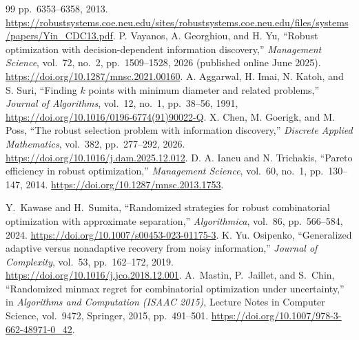 \documentclass[12pt]{article}
\begin{document}
\begin{thebibliography}{99}
pp.~6353--6358, 2013.
\url{https://robustsystems.coe.neu.edu/sites/robustsystems.coe.neu.edu/files/systems/papers/Yin_CDC13.pdf}.
 P. Vayanos, A. Georghiou, and H. Yu,
``Robust optimization with decision-dependent information discovery,''
\emph{Management Science}, vol.~72, no.~2, pp.~1509--1528, 2026
(published online June 2025).
\url{https://doi.org/10.1287/mnsc.2021.00160}.
 A. Aggarwal, H. Imai, N. Katoh, and S. Suri, ``Finding
$k$ points with minimum diameter and related problems,'' \emph{Journal of
Algorithms}, vol.~12, no.~1, pp.~38--56, 1991,
\url{https://doi.org/10.1016/0196-6774(91)90022-Q}.
 X. Chen, M. Goerigk, and M. Poss, ``The robust selection
problem with information discovery,'' \emph{Discrete Applied Mathematics},
vol.~382, pp.~277--292, 2026. \url{https://doi.org/10.1016/j.dam.2025.12.012}.
 D. A. Iancu and N. Trichakis, ``Pareto efficiency in robust
optimization,'' \emph{Management Science}, vol.~60, no.~1, pp.~130--147, 2014.
\url{https://doi.org/10.1287/mnsc.2013.1753}.

Y.~Kawase and H.~Sumita, ``Randomized strategies for robust combinatorial
optimization with approximate separation,'' \emph{Algorithmica}, vol.~86,
pp.~566--584, 2024. \url{https://doi.org/10.1007/s00453-023-01175-3}.
 K. Yu. Osipenko,
``Generalized adaptive versus nonadaptive recovery from noisy information,''
\emph{Journal of Complexity}, vol.~53, pp.~162--172, 2019.
\url{https://doi.org/10.1016/j.jco.2018.12.001}.
A.~Mastin, P.~Jaillet, and S.~Chin, ``Randomized minmax regret for
combinatorial optimization under uncertainty,'' in \emph{Algorithms and
Computation (ISAAC 2015)}, Lecture Notes in Computer Science, vol.~9472,
Springer, 2015, pp.~491--501.
\url{https://doi.org/10.1007/978-3-662-48971-0_42}.


\end{thebibliography}
\end{document}
